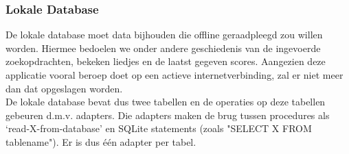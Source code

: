 \documentclass[11pt,a4paper]{article}
\begin{document}
	\subsubsection{Lokale Database}
	\label{sec:Lokale Database}
	De lokale database moet data bijhouden die offline geraadpleegd zou willen worden. Hiermee bedoelen we onder andere geschiedenis van de ingevoerde zoekopdrachten, bekeken liedjes en de laatst gegeven scores. Aangezien deze applicatie vooral beroep doet op een actieve internetverbinding, zal er niet meer dan dat opgeslagen worden. \\ \newline 
	De lokale database bevat dus twee tabellen en de operaties op deze tabellen gebeuren d.m.v. adapters. Die adapters maken de brug tussen procedures als `read-X-from-database' en SQLite statements (zoals "SELECT X FROM tablename"). Er is dus één adapter per tabel. \newline
	 \\ \newline
\end{document}
